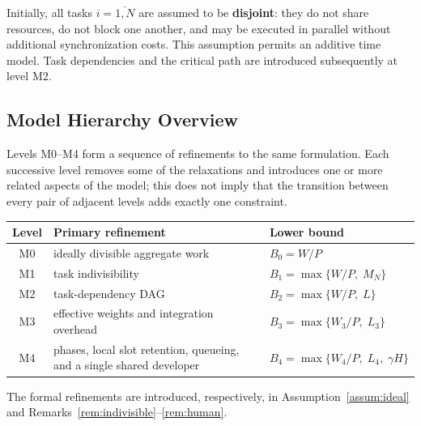 \begin{remark}\label{rem:independent}
Initially, all tasks $i = \overline{1,N}$ are assumed to be \textbf{disjoint}: they do not share resources, do not block one another, and may be executed in parallel without additional synchronization costs. This assumption permits an additive time model. Task dependencies and the critical path are introduced subsequently at level M2.
\end{remark}

\subsection{Model Hierarchy Overview}

\begin{remark}\label{rem:hierarchy}
Levels M0--M4 form a sequence of refinements to the same formulation. Each
successive level removes some of the relaxations and introduces one or more
related aspects of the model; this does not imply that the transition between
every pair of adjacent levels adds exactly one constraint.

\begin{center}
\small
\begin{tabularx}{\textwidth}{@{}c>{\raggedright\arraybackslash}X>{\raggedright\arraybackslash}p{}@{}}
\toprule
Level & Primary refinement & Lower bound \\
\midrule
M0 & ideally divisible aggregate work & $B_0 = W/P$ \\
M1 & task indivisibility & $B_1 = \max\{W/P,\; M_N\}$ \\
M2 & task-dependency DAG & $B_2 = \max\{W/P,\; L\}$ \\
M3 & effective weights and integration overhead & $B_3 = \max\{W_3/P,\; L_3\}$ \\
M4 & phases, local slot retention, queueing, and a single shared developer & $B_4 = \max\{W_4/P,\; L_4,\; \gamma H\}$ \\
\bottomrule
\end{tabularx}
\end{center}

The formal refinements are introduced, respectively, in
Assumption~\ref{assum:ideal} and
Remarks~\ref{rem:indivisible}--\ref{rem:human}.
\end{remark}
